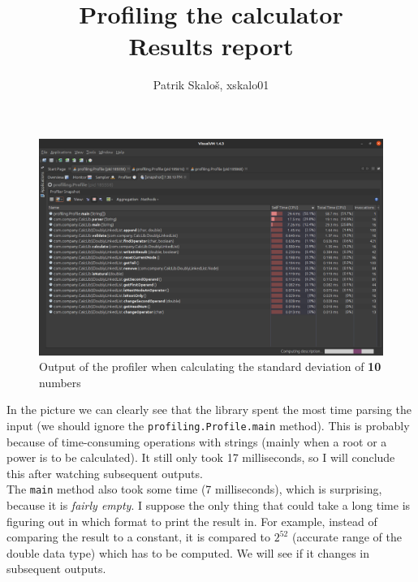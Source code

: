 \documentclass[12pt]{article}
\title{\vspace{4cm}\Huge{Profiling the calculator} \\ \vspace{1cm} \LARGE{Results report}\vfill}
\author{Patrik Skaloš, xskalo01 \vspace{5cm}}
\date{}
\begin{document}
  \begin{landscape}
    \begin{titlepage}
      \maketitle
    \end{titlepage}
  \end{landscape}


    \begin{figure}
      \begin{center}
        \includegraphics[width=16cm]{profiling_result-10_numbers.eps}
        \caption{Output of the profiler when calculating the standard deviation of \textbf{10} numbers}
      \end{center}
    \end{figure}

    In the picture we can clearly see that the library spent the most time 
    parsing the input (we should ignore the \texttt{profiling.Profile.main} method). 
    This is probably because of time-consuming operations with strings (mainly 
    when a root or a power is to be calculated). It still only took 17 milliseconds, 
    so I will conclude this after watching subsequent outputs. \\

    The \texttt{main} method also took some time (7 milliseconds), which is surprising,
    because it is \textit{fairly empty}. I suppose the only thing that could take a long
    time is figuring out in which format to print the result in. For example,
    instead of comparing the result to a constant, it is compared to $2^{52}$ 
    (accurate range of the double data type) which has to be computed. We will
    see if it changes in subsequent outputs.
\end{document}
